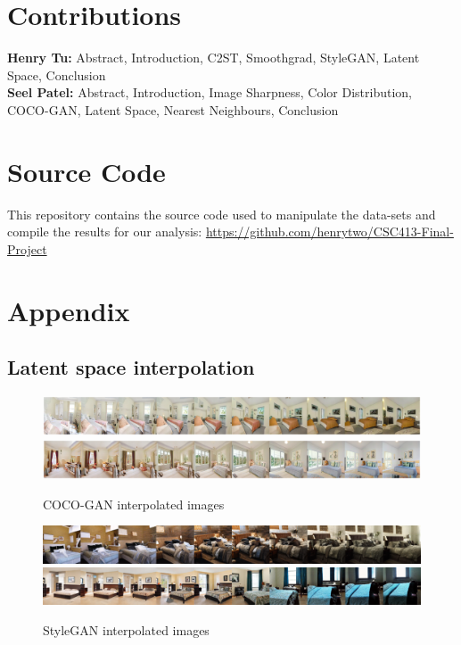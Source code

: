 \documentclass{article}
\begin{document}
    \section{Contributions}
    \textbf{Henry Tu:} Abstract, Introduction, C2ST, Smoothgrad, StyleGAN, Latent Space, Conclusion\\
    \textbf{Seel Patel:} Abstract, Introduction, Image Sharpness, Color Distribution, COCO-GAN, Latent Space, Nearest Neighbours, Conclusion
    
    \section{Source Code}
    This repository contains the source code used to manipulate the data-sets and compile the results for our analysis: \href{https://github.com/henrytwo/CSC413-Final-Project}{https://github.com/henrytwo/CSC413-Final-Project}


    \newpage
    \section{Appendix}
    \subsection{Latent space interpolation}

    \begin{figure}[H]
          \centering
          \includegraphics[scale=0.145]{latent-space/coco_latent_ex.png}
          \includegraphics[scale=0.145]{latent-space/cocogan_latent_interesting.png}
          \caption{COCO-GAN interpolated images}
    \end{figure}
     \begin{figure}[H]
          \centering
          \includegraphics[scale=0.4]{latent-space/stylegan_latent_1.png}
          \includegraphics[scale=0.4]{latent-space/stylegan_latent_2.png}
          \caption{StyleGAN interpolated images}
    \end{figure} 
    \newpage
\end{document}
